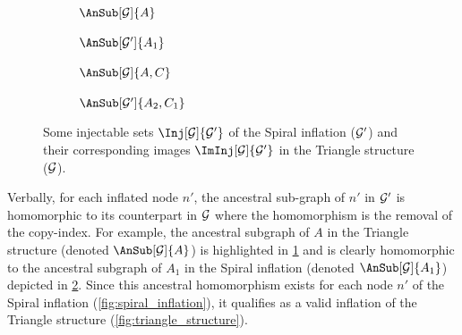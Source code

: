 \documentclass[aps, 10pt, english, twoside, pra, nofootinbib, tightenlines, longbibliography, superscriptaddress]{revtex4-1}
\begin{document}
    \begin{center}
    \begin{figure}
    \begin{subfigure}[b]{.23\linewidth}
    \scalebox{0.8}{}
    \caption{$\AnSub[\graph]{A}$}\label{fig:spiral_inflation_iminj1}
    \end{subfigure}
    \begin{subfigure}[b]{.23\linewidth}
    \scalebox{0.8}{}
    \caption{$\AnSub[\graph']{A_1}$}\label{fig:spiral_inflation_inj1}
    \end{subfigure}
    \begin{subfigure}[b]{.23\linewidth}
    \scalebox{0.8}{}
    \caption{$\AnSub[\graph]{A,C}$}\label{fig:spiral_inflation_iminj2}
    \end{subfigure}
    \begin{subfigure}[b]{.23\linewidth}
    \scalebox{0.8}{}
    \caption{$\AnSub[\graph']{A_2, C_1}$}\label{fig:spiral_inflation_inj2}
    \end{subfigure}
    \caption{Some injectable sets $\Inj[\graph]{\graph'}$ of the Spiral inflation ($\mathcal{G}'$) and their corresponding images $\ImInj[\graph]{\graph'}$ in the Triangle structure ($\mathcal{G}$).}
    \label{fig:injectablesets}
    \end{figure}
    \end{center}
    Verbally, for each inflated node $n'$, the ancestral sub-graph of $n'$ in $\mathcal{G}'$ is homomorphic to its counterpart in $\mathcal{G}$ where the homomorphism is the removal of the copy-index. For example, the ancestral subgraph of $A$ in the Triangle structure (denoted $\AnSub[\graph]{A}$) is highlighted in \cref{fig:spiral_inflation_iminj1} and is clearly homomorphic to the ancestral subgraph of $A_1$ in the Spiral inflation (denoted $\AnSub[\graph]{A_1}$) depicted in \cref{fig:spiral_inflation_inj1}. Since this ancestral homomorphism exists for each node $n'$ of the Spiral inflation (\cref{fig:spiral_inflation}), it qualifies as a valid inflation of the Triangle structure (\cref{fig:triangle_structure}).
\end{document}
